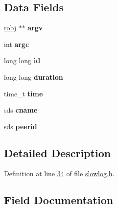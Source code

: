 \subsection*{Data Fields}
\begin{DoxyCompactItemize}
\item 
\mbox{\label{structslowlogEntry_a731739c02a0cff6336c7cab1b3b388ae}} 
\hyperlink{structredisObject}{robj} $\ast$$\ast$ {\bfseries argv}
\item 
\mbox{\label{structslowlogEntry_a6fd815eb2d7c2c8334406e57b2d3c596}} 
int {\bfseries argc}
\item 
\mbox{\label{structslowlogEntry_aa912ab62fa7a75f5281c5e309ca2b321}} 
long long {\bfseries id}
\item 
\mbox{\label{structslowlogEntry_a16b338bdd4baff83c93c0cb324254ce2}} 
long long {\bfseries duration}
\item 
\mbox{\label{structslowlogEntry_a8154951a07692c713b23905c5f7c6cec}} 
time\+\_\+t {\bfseries time}
\item 
\mbox{\label{structslowlogEntry_ae97061f57a9fe9618808f49181c98ed5}} 
sds {\bfseries cname}
\item 
\mbox{\label{structslowlogEntry_a05277f849959d59ec11b827783fc6eee}} 
sds {\bfseries peerid}
\end{DoxyCompactItemize}


\subsection{Detailed Description}


Definition at line \hyperlink{slowlog_8h_source_l00034}{34} of file \hyperlink{slowlog_8h_source}{slowlog.\+h}.



\subsection{Field Documentation}
\mbox{\label{structslowlogEntry_a6fd815eb2d7c2c8334406e57b2d3c596}} 
